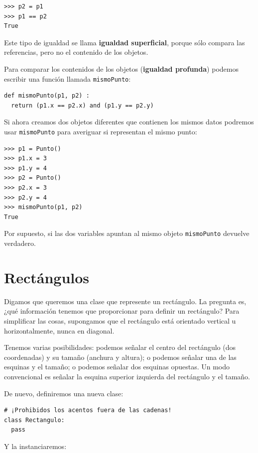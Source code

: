 \beforeverb
\begin{verbatim}
>>> p2 = p1
>>> p1 == p2
True
\end{verbatim}
\afterverb
%
Este tipo de igualdad se llama {\bf igualdad superficial}, porque sólo
compara las referencias, pero no el contenido de los objetos.


Para comparar los contenidos de los objetos ({\bf igualdad profunda}) podemos
escribir una función llamada \texttt{mismoPunto}:

\beforeverb
\begin{verbatim}
def mismoPunto(p1, p2) :
  return (p1.x == p2.x) and (p1.y == p2.y)
\end{verbatim}
\afterverb
%
Si ahora creamos dos objetos diferentes que contienen los mismos datos
podremos usar \texttt{mismoPunto} para averiguar si representan el mismo punto:

\beforeverb
\begin{verbatim}
>>> p1 = Punto()
>>> p1.x = 3
>>> p1.y = 4
>>> p2 = Punto()
>>> p2.x = 3
>>> p2.y = 4
>>> mismoPunto(p1, p2)
True
\end{verbatim}
\afterverb
%
Por supuesto, si las dos variables apuntan al mismo objeto \texttt{mismoPunto}
devuelve verdadero.


\section{Rectángulos}
\label{embedded}

Digamos que queremos una clase que represente un rectángulo. La pregunta es,
¿qué información tenemos que proporcionar para definir un rectángulo? Para
simplificar las cosas, supongamos que el rectángulo está orientado vertical u
horizontalmente, nunca en diagonal.

Tenemos varias posibilidades: podemos señalar el centro del rectángulo
(dos coordenadas) y su tamaño (anchura y altura); o podemos señalar una de
las esquinas y el tamaño; o podemos señalar dos esquinas opuestas. Un modo
convencional es señalar la esquina superior izquierda del rectángulo y el tamaño.

De nuevo, definiremos una nueva clase:

\beforeverb
\begin{verbatim}
# ¡Prohibidos los acentos fuera de las cadenas!
class Rectangulo:	
  pass
\end{verbatim}
\afterverb
%
Y la instanciaremos:

